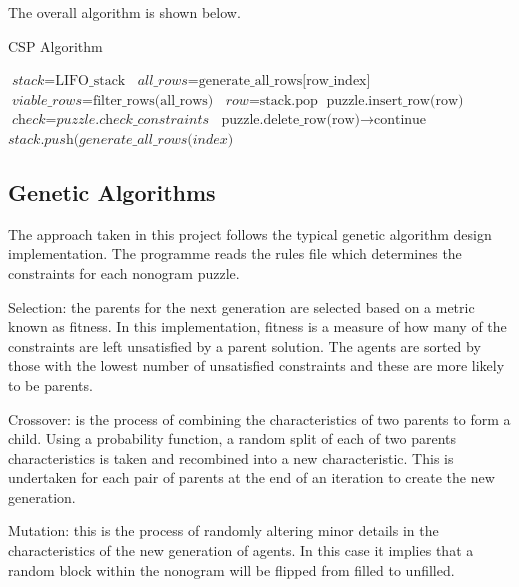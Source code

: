 \documentclass{svproc}
\begin{document}
The overall algorithm is shown below.

\begin{algorithm}
    \caption{CSP Algorithm}\label{euclid}
    \begin{algorithmic}[1]
        \State $\textit{stack} = \text{LIFO\_stack}$
        \State $\textit{all\_rows} = \text{generate\_all\_rows[row\_index]}$
        \State $\textit{viable\_rows} = \text{filter\_rows(all\_rows)}$
        \State $\textit{row} = \text{stack.pop}$
        \State $\text{puzzle.insert\_row(row)}$
        \State $\textit{check} = \textit{puzzle.check\_constraints}$
        \State $\text{puzzle.delete\_row(row)} \to \text{continue}$
        \EndIf
        \State $\textit{stack.push(generate\_all\_rows(index)}$
        \EndWhile
        \EndWhile
    \end{algorithmic}
\end{algorithm}

\subsection{Genetic Algorithms}
The approach taken in this project follows the typical genetic algorithm design implementation. The programme reads the rules file which determines the constraints for each nonogram puzzle.

Selection: the parents for the next generation are selected based on a metric known as fitness. In this implementation, fitness is a measure of how many of the constraints are left unsatisfied by a parent solution. The agents are sorted by those with the lowest number of unsatisfied constraints and these are more likely to be parents.

Crossover: is the process of combining the characteristics of two parents to form a child. Using a probability function, a random split of each of two parents characteristics is taken and recombined into a new characteristic. This is undertaken for each pair of parents at the end of an iteration to create the new generation.

Mutation: this is the process of randomly altering minor details in the characteristics of the new generation of agents. In this case it implies that a random block within the nonogram will be flipped from filled to unfilled.
\end{document}
